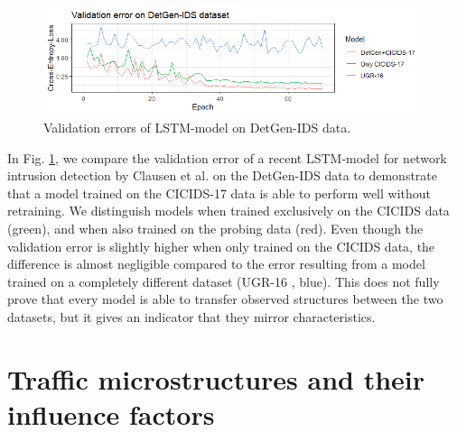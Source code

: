 \documentclass[runningheads]{llncs}
\begin{document}
\begin{figure}
\centering
\includegraphics[width=0.99\textwidth]{images/ValLoss.png}
\caption{Validation errors of LSTM-model \cite{henryLSTM} on DetGen-IDS data.}\label{Fig:ValLoss}
\end{figure}

In Fig. \ref{Fig:ValLoss}, we compare the validation error of a recent LSTM-model for network intrusion detection by Clausen et al. \cite{henryLSTM} on the DetGen-IDS data to demonstrate that a model trained on the CICIDS-17 data is able to perform well without retraining. We distinguish models when trained exclusively on the CICIDS data (green), and when also trained on the probing data (red). 
Even though the validation error is slightly higher when only trained on the CICIDS data, the difference is almost negligible compared to the error resulting from a model trained on a completely different dataset (UGR-16 \cite{macia2018ugr}, blue). This does not fully prove that every model is able to transfer observed structures between the two datasets, but it gives an indicator that they mirror characteristics.








\section{Traffic microstructures and their influence factors}\label{Sec:DetGenMicro}
\end{document}
